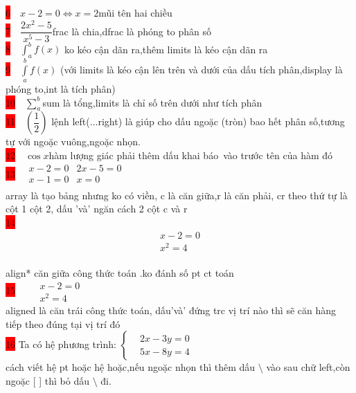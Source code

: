 \documentclass{article}
\begin{document}
\colorbox{red}{6}$\quad x-2=0 \Leftrightarrow x=2 $\quad mũi tên hai chiều\\

\colorbox{red}{7}$\quad\dfrac{2x^2-5}{x^5-3}$\quad frac là chia,dfrac là phóng to phân số\\

\colorbox{red}{8}$\quad \displaystyle\int_a^bf(x)$ \quad ko kéo cận dãn ra,thêm limits là kéo cận dãn ra\\

\colorbox{red}{9}$\quad\displaystyle\int\limits_a^bf(x)$ (với limits là kéo cận lên trên và dưới của dấu tích phân,display là phóng to,int là tích phân)\\

\colorbox{red}{10}$\quad\displaystyle\sum\limits_a^b$\quad sum là tổng,limits là chỉ số trên dưới như tích phân\\

\colorbox{red}{11}$\quad\left(\dfrac{1}{2}\right)$ \quad lệnh left(...right) là giúp cho dấu ngoặc (tròn) bao hết phân số,tương tự với ngoặc vuông,ngoặc nhọn.\\

\colorbox{red}{12}$\quad\cos x$\quad hàm lượng giác phải thêm dấu khai báo\ vào trước tên của hàm đó\\

 \colorbox{red}{13}$\quad\begin{array}{cr}
 x-2=0 & 2x-5=0\\
 x-1=0 & x=0\\
 \end{array}$\\
 array là tạo bảng nhưng ko có viền, c là căn giữa,r là căn phải, cr theo thứ tự là cột 1 cột 2, dấu 'và' ngăn cách 2 cột c và r\\
 \colorbox{red}{14}\begin{align*}
 x-2=0\\
 x^2=4
 \end{align*}\\
 align* căn giữa công thức toán .ko đánh số pt ct toán\\
\colorbox{red}{15} $\quad\begin{aligned}
 &x-2=0\\
 &x^2=4
 \end{aligned}$\\
 aligned là căn trái công thức toán, dấu'và' đứng trc vị trí nào thì sẽ căn hàng tiếp theo đúng tại vị trí đó\\
 
 \colorbox{red}{16} Ta có hệ phương trình: $\left\{\begin{aligned}
     & 2x-3y=0\\
     & 5x-8y=4
 \end{aligned}\right.$\\
 cách viết hệ pt hoặc hệ hoặc,nếu ngoặc nhọn thì thêm dấu $\setminus$ vào sau chữ left,còn ngoặc [ ] thì bỏ dấu $\setminus$ đi.\\
\end{document}

